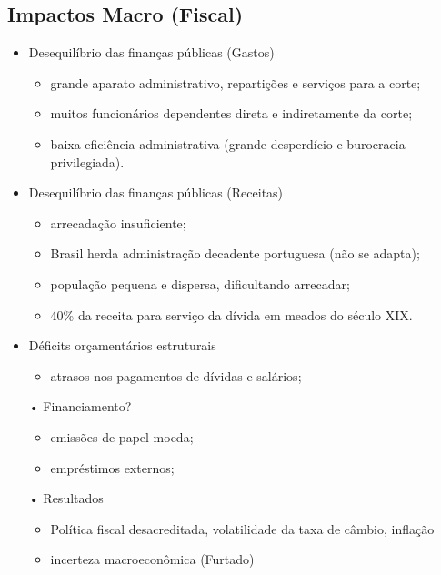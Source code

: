 \documentclass[a4paper,12pt]{article}[abntex2]
\begin{document}
\subsection{\textbf{Impactos Macro (Fiscal)}}
\begin{itemize}
    \item Desequilíbrio das finanças públicas (Gastos) 
    \begin{itemize}
        \item grande aparato administrativo, repartições e serviços para a corte;
        \item muitos funcionários dependentes direta e indiretamente da corte;
        \item baixa eficiência administrativa (grande desperdício e burocracia privilegiada).
    \end{itemize}
    \item Desequilíbrio das finanças públicas (Receitas) 
    \begin{itemize}
        \item arrecadação insuficiente;
        \item Brasil herda administração decadente portuguesa (não se adapta);
        \item população pequena e dispersa, dificultando arrecadar;
        \item 40\% da receita para serviço da dívida em meados do século XIX.
    \end{itemize}
    \item Déficits orçamentários estruturais 
    \begin{itemize}
        \item atrasos nos pagamentos de dívidas e salários;
    \end{itemize}
• Financiamento?
\begin{itemize}
    \item emissões de papel-moeda;
\end{itemize}
\begin{itemize}
    \item empréstimos externos;
\end{itemize}
• Resultados
\begin{itemize}
    \item Política fiscal desacreditada, volatilidade da taxa de câmbio, inflação
\end{itemize}
\begin{itemize}
    \item  incerteza macroeconômica (Furtado)
\end{itemize}

 

\end{itemize}
\end{document}
